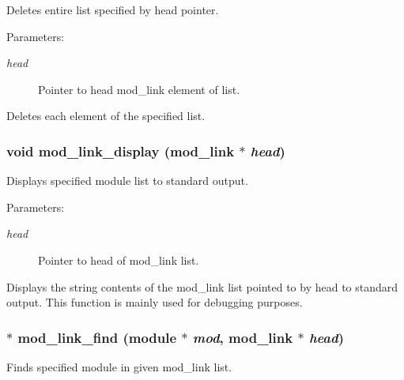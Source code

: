 Deletes entire list specified by head pointer.

\begin{Desc}
\item[Parameters: ]\par
\begin{description}
\item[{\em 
head}]Pointer to head mod\_\-link element of list.\end{description}
\end{Desc}
Deletes each element of the specified list. 
\subsubsection{\setlength{\rightskip}{0pt plus 5cm}void mod\_\-link\_\-display ({\bf mod\_\-link} $\ast$ {\em head})}\label{link_8c_a10}


Displays specified module list to standard output.

\begin{Desc}
\item[Parameters: ]\par
\begin{description}
\item[{\em 
head}]Pointer to head of mod\_\-link list.\end{description}
\end{Desc}
Displays the string contents of the mod\_\-link list pointed to by head to standard output. This function is mainly used for debugging purposes. 
\subsubsection{$\ast$ mod\_\-link\_\-find ({\bf module} $\ast$ {\em mod}, {\bf mod\_\-link} $\ast$ {\em head})}\label{link_8c_a15}


Finds specified module in given mod\_\-link list.

